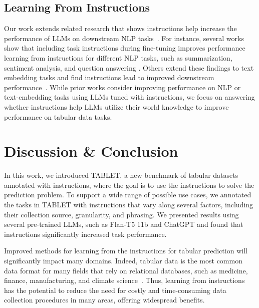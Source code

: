 \subsection{Learning From Instructions}

Our work extends related research that shows instructions help increase the performance of LLMs on downstream NLP tasks~\cite{sanh2022multitask, supernaturalinstructions, min-etal-2022-metaicl, zhong-etal-2021-adapting-language}. For instance, several works show that including task instructions during fine-tuning improves performance learning from instructions for different NLP tasks, such as summarization, sentiment analysis, and question answering \cite{wei2022finetuned, mishra-etal-2022-cross, ye2023guess}. Others extend these findings to text embedding tasks and find instructions lead to improved downstream performance~\cite{Su2022OneEA}. While prior works consider improving performance on NLP or text-embedding tasks using LLMs tuned with instructions, we focus on answering whether instructions help LLMs utilize their world knowledge to improve performance on tabular data tasks.

\section{Discussion \& Conclusion}

In this work, we introduced TABLET, a new benchmark of tabular datasets annotated with instructions, where the goal is to use the instructions to solve the prediction problem. To support a wide range of possible use cases, we annotated the tasks in TABLET with instructions that vary along several factors, including their collection source, granularity, and phrasing. We presented results using several pre-trained LLMs, such as Flan-T5 11b and ChatGPT and found that instructions significantly increased task performance.

Improved methods for learning from the instructions for tabular prediction will significantly impact many domains. Indeed, tabular data is the most common data format for many fields that rely on relational databases, such as medicine, finance, manufacturing, and climate science~\cite{shwartz-ziv2021tabular}. Thus, learning from instructions has the potential to reduce the need for costly and time-consuming data collection procedures in many areas, offering widespread benefits.

